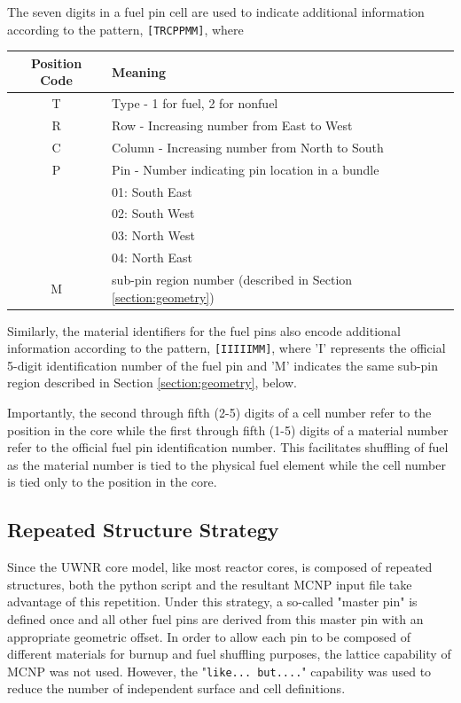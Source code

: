 \documentclass{UWNR_modeling}
\begin{document}
The seven digits in a fuel pin cell are used to indicate additional information according to the pattern, 
\texttt{[TRCPPMM]}, where

\begin{tabular}{|c|l|}
\hline
Position Code & Meaning \\\hline
T & Type     - 1 for fuel, 2 for nonfuel\\
R & Row      - Increasing number from East to West\\
C & Column   - Increasing number from North to South\\
P & Pin      - Number indicating pin location in a bundle\\
 & 01: South East\\
 & 02: South West\\
 & 03: North West\\
 & 04: North East\\
M & sub-pin region number (described in Section \ref{section:geometry})\\\hline
\end{tabular}

Similarly, the material identifiers for the fuel pins also encode additional information according to the pattern,
\texttt{[IIIIIMM]}, where 'I' represents the official 5-digit identification number of the fuel pin and 'M' indicates the same sub-pin region described in Section \ref{section:geometry}, below.

Importantly, the second through fifth (2-5) digits of a cell number refer to the position in the core while the first through fifth (1-5) digits of a material number refer to the official fuel pin identification number.  This facilitates shuffling of fuel as the material number is tied to the physical fuel element while the cell number is tied only to the position in the core.

\subsection{Repeated Structure Strategy}

Since the UWNR core model, like most reactor cores, is composed of repeated structures, both the python script and the resultant MCNP input file take advantage of this repetition.  Under this strategy, a so-called "master pin" is defined once and all other fuel pins are derived from this master pin with an appropriate geometric offset.  In order to allow each pin to be composed of different materials for burnup and fuel shuffling purposes, the lattice capability of MCNP was not used.  However, the "\texttt{like... but....}" capability was used to reduce the number of independent surface and cell definitions.
\end{document}
